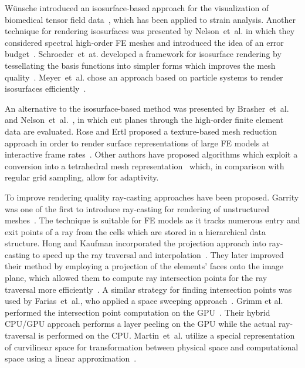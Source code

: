 \documentclass[journal]{vgtc}                %
\begin{document}
W{\"u}nsche introduced an isosurface-based approach for the visualization of biomedical tensor field data~\cite{wunsche03femvis}, which has been applied to strain analysis. Another technique for rendering isosurfaces was presented by Nelson~et~al. in which they considered spectral high-order FE  meshes and introduced the idea of an error budget~\cite{nelsonhp06}. Schroeder~et~at. developed a framework for isosurface rendering by tessellating the basis functions into simpler forms which improves the mesh quality~\cite{schroeder06femtess}. Meyer~et~al. chose an approach based on particle systems to render isosurfaces efficiently~\cite{Meyer06}.

An alternative to the isosurface-based method was presented by Brasher~et~al.~\cite{brasher04} and Nelson~et~al.~\cite{nelson11}, in which cut planes through the high-order finite element data are evaluated. Rose and Ertl proposed a texture-based mesh reduction approach in order to render surface representations of large FE models at interactive frame rates~\cite{rose03femvis}. Other authors have proposed algorithms which exploit a conversion into a tetrahedral mesh representation~\cite{Reed95IncrementalSlicing, marmitt05femtess, Georgii06ageneric} which, in comparison with regular grid sampling, allow for adaptivity.

To improve rendering quality ray-casting approaches have been proposed. Garrity was one of the first to introduce ray-casting for rendering of unstructured meshes~\cite{garrity90RaytracingIrregular}. The technique is suitable for FE models as it tracks numerous entry and exit points of a ray from the cells which are stored in a hierarchical data structure. Hong and Kaufman incorporated the projection approach into ray-casting to speed up the ray traversal and interpolation~\cite{hong98curvilinear}. They later improved their method by employing a projection of the elements' faces onto the image plane, which allowed them to compute ray intersection points for the ray traversal more efficiently~\cite{hong99curvilinear}. A similar strategy for finding intersection points was used by Farias~et~al., who applied a space sweeping approach~\cite{farias00zsweep}. Grimm et al. performed the intersection point computation on the GPU~\cite{grimm04curvilinear}. Their hybrid CPU/GPU approach performs a layer peeling on the GPU while the actual ray-traversal is performed on the CPU. Martin~et~al. utilize a special representation of curvilinear space for transformation between physical space and computational space using a linear approximation~\cite{MartinCurvilinearPacificVIS08}.
\end{document}
